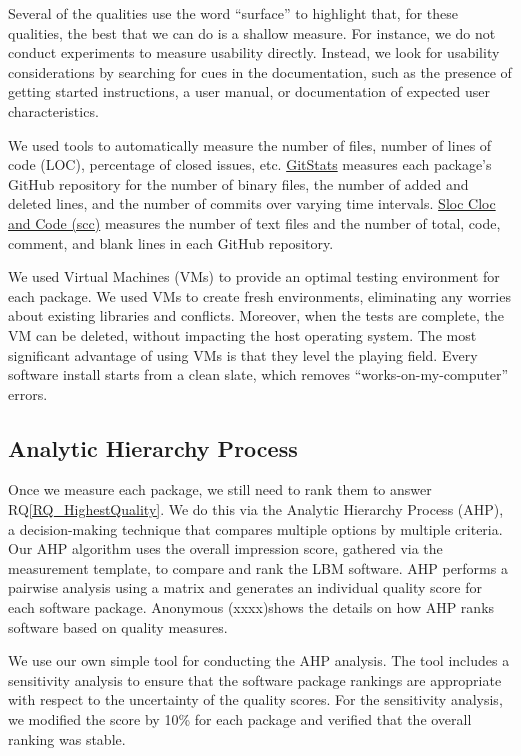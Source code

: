 \documentclass[final, 3p, times, authoryear]{elsarticle}
\newcommand{\rqref}[1]{RQ\ref{#1}}
\begin{document}
Several of the qualities use the word ``surface'' to highlight that, for these
qualities, the best that we can do is a shallow measure. For instance, we do not
conduct experiments to measure usability directly. Instead, we look for
usability considerations by searching for cues in the documentation, such as the
presence of getting started instructions, a user manual, or documentation of
expected user characteristics. 

We used tools to automatically measure the number of files, number of lines of
code (LOC), percentage of closed issues, etc.
\href{https://github.com/tomgi/git_stats}{GitStats} \citep{Gieniusz2019}
measures each package's GitHub repository for the number of binary files, the
number of added and deleted lines, and the number of commits over varying time
intervals. \href{https://github.com/boyter/scc}{Sloc Cloc and Code (scc)}
\citep{Boyter2021} measures the number of text files and the number of total,
code, comment, and blank lines in each GitHub repository. 

We used Virtual Machines (VMs) to provide an
optimal testing environment for each package. We used VMs to create fresh
environments, eliminating any worries about existing libraries and conflicts.
Moreover, when the tests are complete, the VM can be deleted, without impacting
the host operating system. The most significant advantage of using VMs is that
they level the playing field. Every software install starts from a clean slate,
which removes ``works-on-my-computer'' errors.

\subsection{Analytic Hierarchy Process} \label{AHP}

Once we measure each package, we still need to rank them to answer
\rqref{RQ_HighestQuality}. We do this via the Analytic Hierarchy Process (AHP),
a decision-making technique that compares multiple options by multiple criteria.
Our AHP algorithm uses the overall impression score, gathered via the
measurement template, to compare and rank the LBM software. AHP performs a
pairwise analysis using a matrix and generates an individual quality score for
each software package. Anonymous (xxxx)\footnotemark[1] %
shows the details on how AHP ranks
software based on quality measures.

We use our own simple tool for conducting the AHP analysis. The tool includes a
sensitivity analysis to ensure that the software package rankings are
appropriate with respect to the uncertainty of the quality scores. For the
sensitivity analysis, we modified the score by 10\% for each package and
verified that the overall ranking was stable.  
\end{document}
